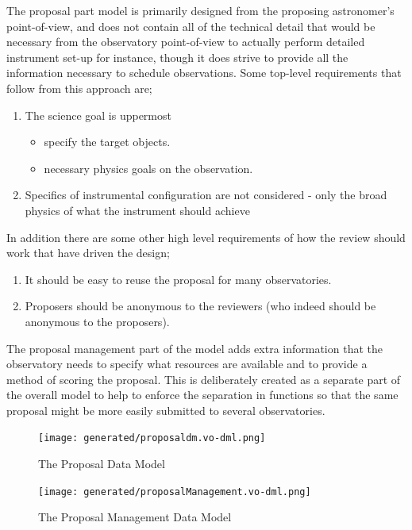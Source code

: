\documentclass[10pt,a4paper]{ivoa}
\begin{document}
The proposal part model is primarily designed from the proposing astronomer's point-of-view, and does not contain all of the technical detail
that would be necessary from the observatory point-of-view to actually perform detailed instrument set-up for instance, though it does
strive to provide all the information necessary to schedule observations. Some top-level requirements that follow from this approach are;

\begin{enumerate}
    \item The science goal is uppermost
    \begin{itemize}
        \item specify the target objects.
        \item necessary physics goals on the observation.
    \end{itemize}
    \item Specifics of instrumental configuration are not considered - only the broad physics of what the instrument should achieve
\end{enumerate}

In addition there are some other high level requirements of how the review should work that have driven the design;

\begin{enumerate}
    \item It should be easy to reuse the proposal for many observatories.
    \item Proposers should be anonymous to the reviewers (who indeed should be anonymous to the proposers).
\end{enumerate}


The proposal management part of the model adds extra information that the observatory needs to specify what resources are available
and to provide a method of scoring the proposal. This is deliberately created as a separate part of the overall model to help
to enforce the separation in functions so that the same proposal might be more easily submitted to several observatories.



\begin{figure}
    \centering
\texttt{[image: generated/proposaldm.vo-dml.png]}
\caption{The Proposal Data Model}
\label{fig:propdm}
\end{figure}


\begin{figure}
    \centering
    \texttt{[image: generated/proposalManagement.vo-dml.png]}
    \caption{The Proposal Management Data Model}
    \label{fig:propmdm}
\end{figure}
\end{document}
